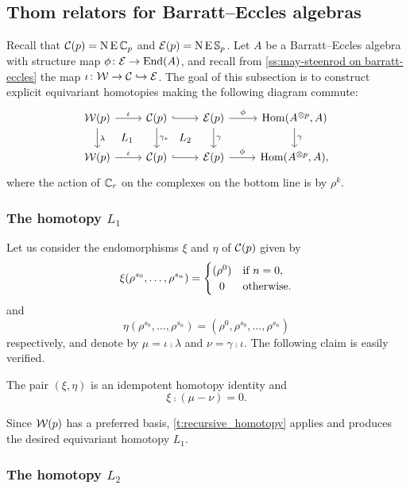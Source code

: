 \subsection{Thom relators for Barratt--Eccles algebras}

Recall that $\mathcal{C}(p) = \operatorname{N} \operatorname{E} \mathbb{C}_p$ and $\mathcal{E}(p) = \operatorname{N} \operatorname{E} \mathbb{S}_p$.
Let $A$ be a Barratt--Eccles algebra with structure map $\phi \colon \mathcal{E} \to \mathrm{End}(A)$, and recall from \cref{ss:may-steenrod on barratt-eccles} the map $\iota \colon \mathcal{W} \to \mathcal{C} \hookrightarrow \mathcal{E}$.
The goal of this subsection is to construct explicit equivariant homotopies making the following diagram commute:
\[
\begin{tikzcd}
	\cW(p) \arrow[r, "\iota"] \arrow[d,"\lambda"] \arrow[dr,phantom,"L_1"] &
	\cC(p) \arrow[r, hook] \arrow[d, "\gamma_\ast"] \arrow[dr,phantom,"L_2"] &
	\BE(p) \arrow[r,"\phi"] \arrow[d,"\gamma"] &
	\Hom(A^{\ot p}, A) \arrow[d,"\gamma"] \\
	\cW(p) \arrow[r, "\iota"] &
	\cC(p) \arrow[r, hook] &
	\BE(p) \arrow[r,"\phi"] &
	\Hom(A^{\ot p}, A),
\end{tikzcd}
\]
where the action of $\mathbb{C}_r$ on the complexes on the bottom line is by $\rho^k$.

\subsubsection{The homotopy $L_1$}

Let us consider the endomorphisms $\xi$ and $\eta$ of $\mathcal{C}(p)$ given by
\[
\xi(\rho^{s_0},\dots,\rho^{s_n}) =
\begin{cases}
	(\rho^0) & \text{if } n = 0, \\
	\hfil0 & \text{otherwise}.
\end{cases}
\]
and
\[
\eta(\rho^{s_0},\dots,\rho^{s_n}) = (\rho^0,\rho^{s_0},\dots,\rho^{s_n})
\]
respectively, and denote by $\mu = \iota \comp \lambda$ and $\nu = \gamma \comp \iota$.
The following claim is easily verified.

\begin{lemma}
	The pair $(\xi,\eta)$ is an idempotent homotopy identity and
	\[
	\xi \comp (\mu - \nu) = 0.
	\]
\end{lemma}
Since $\mathcal{W}(p)$ has a preferred basis, \cref{t:recursive_homotopy} applies and produces the desired equivariant homotopy $L_1$.

\subsubsection{The homotopy $L_2$}

